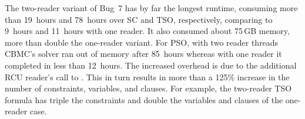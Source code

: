 The two-reader variant of Bug~7 has by far the longest
runtime, consuming more than 19~hours and
78~hours over SC and TSO, respectively, comparing to 9~hours and 11~hours
with one reader.  It also consumed about 75\,GB memory, more than double
the one-reader variant.  For PSO, with two reader threads CBMC's solver ran
out of memory after 85~hours whereas with one reader it completed
in less than 12~hours.  The increased overhead
is due to the
additional RCU reader's call to
.
This in turn results in
more than a 125\% increase in the number of constraints, variables, and
clauses.  For example, the two-reader TSO formula has
triple the constraints and double the variables and clauses
of the one-reader case.
